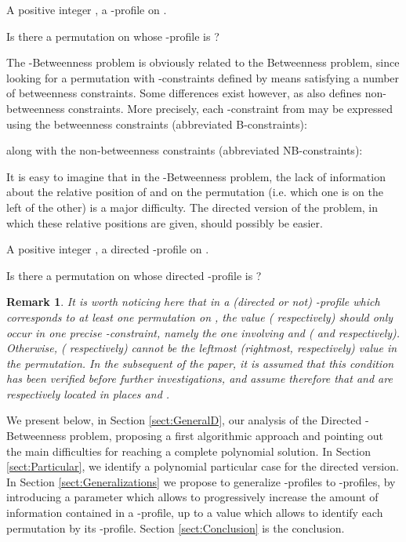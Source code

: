 \documentclass{article}
\newtheorem{rmk}{Remark}
\newcommand{\br}{\begin{rmk}\rm}
\newcommand{\er}{\end{rmk}}
\begin{document}

 A positive integer , a  -profile  on . 

 Is there a permutation  on  whose -profile is ? 
\bigskip



The -{\sc Betweenness} problem is obviously related to the {\sc Betweenness} problem, since looking for a permutation
 with -constraints defined by  means satisfying a number of betweenness constraints.  Some differences
exist however, as  also defines non-betweenness constraints. More precisely, each -constraint
 from  may be expressed using the betweenness constraints 
(abbreviated B-constraints):


\noindent along with the non-betweenness constraints (abbreviated NB-constraints):




It is easy to imagine that in the -{\sc Betweenness} problem, the lack of information about
the relative position of   and  on the permutation  (i.e. which one is on the left of the other)
is a major difficulty. The directed version of the problem, in which these relative positions are given, should
possibly be easier.
\bigskip


 A positive integer , a directed -profile  on .

 Is there a permutation  on  whose directed -profile is ? 
\bigskip

\br
It is worth noticing here that in a (directed or not) -profile which corresponds to
at least one permutation on , the value  ( respectively) should
only occur in one precise -constraint, namely the one involving  and  ( and
 respectively). Otherwise,  ( respectively) cannot be the leftmost (rightmost, respectively)
value in the permutation. In the subsequent of the paper, it is assumed that this condition
has been verified before further investigations, and assume therefore that  and 
are respectively located in places  and .
\label{rem:places0n+1}
\er

We present below, in Section \ref{sect:GeneralD}, our analysis of the Directed -{\sc Betweenness} problem,
proposing a first algorithmic approach and pointing out the main difficulties for reaching a complete polynomial solution. 
In Section \ref{sect:Particular}, we identify a polynomial particular case for the directed version. 
In Section \ref{sect:Generalizations} we propose to generalize -profiles to -profiles, by introducing 
a parameter  which allows to progressively increase the amount of information contained in a -profile, 
up to a value  which allows to identify each permutation by its -profile. Section \ref{sect:Conclusion} is the
conclusion.
\end{document}
